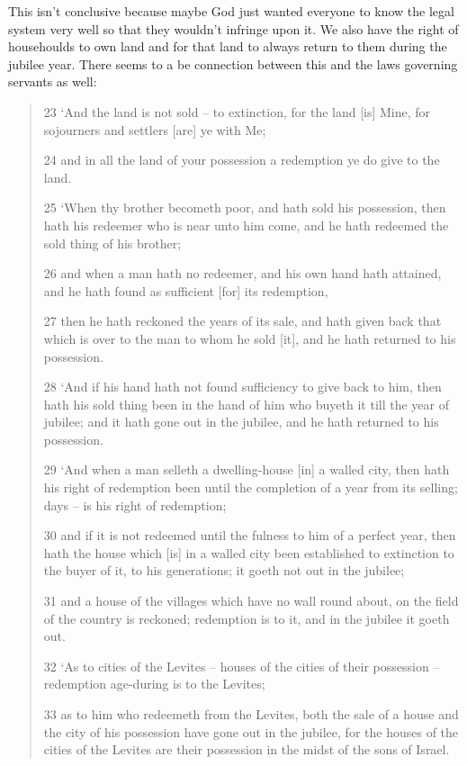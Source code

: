 \documentclass[11pt]{article}
\begin{document}
{This isn't conclusive because maybe God just wanted everyone to know the legal system very well so that they wouldn't infringe upon it. We also have the right of househoulds to own land and for that land to always return to them during the jubilee year. There seems to a be connection between this and the laws governing servants as well:
\begin{quote}
23 `And the land is not sold -- to extinction, for the land [is] Mine, for sojourners and settlers [are] ye with Me;

24 and in all the land of your possession a redemption ye do give to the land.

25 `When thy brother becometh poor, and hath sold his possession, then hath his redeemer who is near unto him come, and he hath redeemed the sold thing of his brother;

26 and when a man hath no redeemer, and his own hand hath attained, and he hath found as sufficient [for] its redemption,

27 then he hath reckoned the years of its sale, and hath given back that which is over to the man to whom he sold [it], and he hath returned to his possession.

28 `And if his hand hath not found sufficiency to give back to him, then hath his sold thing been in the hand of him who buyeth it till the year of jubilee; and it hath gone out in the jubilee, and he hath returned to his possession.

29 `And when a man selleth a dwelling-house [in] a walled city, then hath his right of redemption been until the completion of a year from its selling; days -- is his right of redemption;

30 and if it is not redeemed until the fulness to him of a perfect year, then hath the house which [is] in a walled city been established to extinction to the buyer of it, to his generations; it goeth not out in the jubilee;

31 and a house of the villages which have no wall round about, on the field of the country is reckoned; redemption is to it, and in the jubilee it goeth out.

32 `As to cities of the Levites -- houses of the cities of their possession -- redemption age-during is to the Levites;

33 as to him who redeemeth from the Levites, both the sale of a house and the city of his possession have gone out in the jubilee, for the houses of the cities of the Levites are their possession in the midst of the sons of Israel.


\end{quote}}
\end{document}
